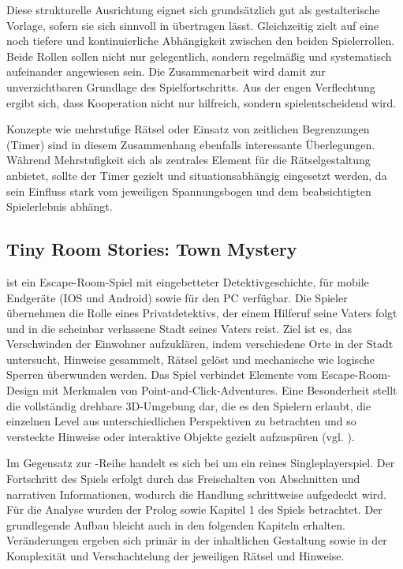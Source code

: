 Diese strukturelle Ausrichtung eignet sich grundsätzlich gut als gestalterische Vorlage, sofern sie sich sinnvoll in  übertragen lässt. Gleichzeitig zielt  auf eine noch tiefere und kontinuierliche Abhängigkeit zwischen den beiden Spielerrollen. Beide Rollen sollen nicht nur gelegentlich, sondern regelmäßig und systematisch aufeinander angewiesen sein. Die Zusammenarbeit wird damit zur unverzichtbaren Grundlage des Spielfortschritts. Aus der engen Verflechtung ergibt sich, dass Kooperation nicht nur hilfreich, sondern spielentscheidend wird.

Konzepte wie mehrstufige Rätsel oder Einsatz von zeitlichen Begrenzungen (Timer) sind in diesem Zusammenhang ebenfalls interessante Überlegungen. Während Mehrstufigkeit sich als zentrales Element für die Rätselgestaltung anbietet, sollte der Timer gezielt und situationsabhängig eingesetzt werden, da sein Einfluss stark vom jeweiligen Spannungsbogen und dem beabsichtigten Spielerlebnis abhängt.

\subsection{Tiny Room Stories: Town Mystery}
 ist ein Escape-Room-Spiel mit eingebetteter Detektivgeschichte, für mobile Endgeräte (IOS und Android) sowie für den PC verfügbar. Die Spieler übernehmen die Rolle eines Privatdetektivs, der einem Hilferuf seine Vaters folgt und in die scheinbar verlassene Stadt  seines Vaters reist. Ziel ist es, das Verschwinden der Einwohner aufzuklären, indem verschiedene Orte in der Stadt untersucht, Hinweise gesammelt, Rätsel gelöst und mechanische wie logische Sperren überwunden werden. 
Das Spiel verbindet Elemente vom Escape-Room-Design mit Merkmalen von Point-and-Click-Adventures. Eine Besonderheit stellt die vollständig drehbare \ac{3D}-Umgebung dar, die es den Spielern erlaubt, die einzelnen Level aus unterschiedlichen Perspektiven zu betrachten und so versteckte Hinweise oder interaktive Objekte gezielt aufzuspüren (vgl. \citealp{kiary_games_tiny_2021}).

Im Gegensatz zur -Reihe handelt es sich bei  um ein reines Singleplayerspiel. Der Fortschritt des Spiels erfolgt durch das Freischalten von Abschnitten und narrativen Informationen, wodurch die Handlung schrittweise aufgedeckt wird. Für die Analyse wurden der Prolog sowie Kapitel 1 des Spiels betrachtet. Der grundlegende Aufbau bleicht auch in den folgenden Kapiteln erhalten. Veränderungen ergeben sich primär in der inhaltlichen Gestaltung sowie in der Komplexität und Verschachtelung der jeweiligen Rätsel und Hinweise.

